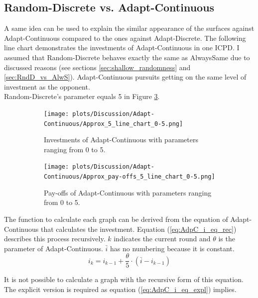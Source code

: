 \documentclass[11pt]{article}
\begin{document}
\subsection{Random-Discrete vs. Adapt-Continuous}
	A same idea can be used to explain the similar appearance of the surfaces against Adapt-Continuous compared to the ones against Adapt-Discrete.
	The following line chart demonstrates the investments of Adapt-Continuous in one ICPD.
	I assumed that Random-Discrete behaves exactly the same as AlwaysSame due to discussed reasons (see sections \ref{sec:shallow_randomness} and \ref{sec:RndD_vs_AlwS}).
	Adapt-Continuous pursuits getting on the same level of investment as the opponent.\\
	Random-Discrete's parameter equals 5 in Figure \ref{fig:AdpC_approx_invetm_and_payoffs_0-5}.\\
	\begin{figure}[h!]
		\centering
		\begin{subfigure}[t]{0.45\textwidth}
			\centering
			\texttt{[image: plots/Discussion/Adapt-Continuous/Approx\_5\_line\_chart\_0-5.png]}\\
			\caption{Investments of Adapt-Continuous with parameters ranging from 0 to 5.}
			\label{fig:AdpC_approx_investm_0-5}
		\end{subfigure}
		\hfill
		\begin{subfigure}[t]{0.45\textwidth}
			\centering
			\texttt{[image: plots/Discussion/Adapt-Continuous/Approx\_pay-offs\_5\_line\_chart\_0-5.png]}
			\caption{Pay-offs of Adapt-Continuous with parameters ranging from 0 to 5.}
			\label{fig:AdpC_approx_payoff_0-5}
		\end{subfigure}
		\caption{}
		\label{fig:AdpC_approx_invetm_and_payoffs_0-5}
	\end{figure}

	The function to calculate each graph can be derived from the equation of Adapt-Continuous that calculates the investment.
	Equation (\ref{eq:AdpC_i_eq_rec}) describes this process recursively.
	$k$ indicates the current round and $\theta$ is the parameter of Adapt-Continuous.
	$\bar i$ has no numbering because it is constant.
	\begin{equation}
		i_k = i_{k-1} + \frac{\theta}{5} \cdot (\bar i - i_{k-1})
		\label{eq:AdpC_i_eq_rec}
	\end{equation}

	It is not possible to calculate a graph with the recursive form of this equation.
	The explicit version is required as equation (\ref{eq:AdpC_i_eq_expl}) implies.
\end{document}

